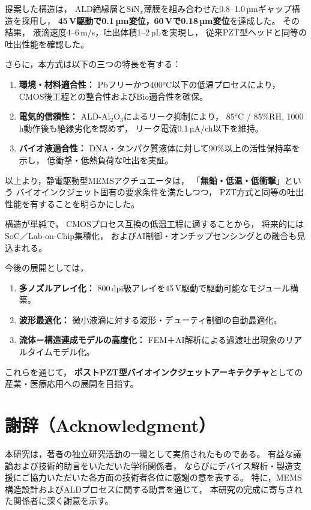 \documentclass[conference]{IEEEtran}
\begin{document}
提案した構造は，
ALD絶縁層とSiN$_x$薄膜を組み合わせた0.8--1.0\,µmギャップ構造を採用し，
\textbf{45\,V駆動で0.1\,µm変位，60\,Vで0.18\,µm変位}を達成した。
その結果，
液滴速度4--6\,m/s，吐出体積1--2\,pLを実現し，
従来PZT型ヘッドと同等の吐出性能を確認した。

さらに，本方式は以下の三つの特長を有する：
\begin{enumerate}
  \item \textbf{環境・材料適合性：}  
        Pbフリーかつ400°C以下の低温プロセスにより，
        CMOS後工程との整合性およびBio適合性を確保。
  \item \textbf{電気的信頼性：}  
        ALD-Al$_2$O$_3$によるリーク抑制により，
        85°C / 85\%RH, 1000 h動作後も絶縁劣化を認めず，
        リーク電流0.1\,µA/ch以下を維持。
  \item \textbf{バイオ液適合性：}  
        DNA・タンパク質液体に対して90\%以上の活性保持率を示し，
        低衝撃・低熱負荷な吐出を実証。
\end{enumerate}

以上より，静電駆動型MEMSアクチュエータは，
「\textbf{無鉛・低温・低衝撃}」という
バイオインクジェット固有の要求条件を満たしつつ，
PZT方式と同等の吐出性能を有することを明らかにした。

構造が単純で，
CMOSプロセス互換の低温工程に適することから，
将来的にはSoC／Lab-on-Chip集積化，
およびAI制御・オンチップセンシングとの融合も見込まれる。

今後の展開としては，
\begin{enumerate}
  \item \textbf{多ノズルアレイ化：}  
        800\,dpi級アレイを45\,V駆動で駆動可能なモジュール構築。
  \item \textbf{波形最適化：}  
        微小液滴に対する波形・デューティ制御の自動最適化。
  \item \textbf{流体－構造連成モデルの高度化：}  
        FEM＋AI解析による過渡吐出現象のリアルタイムモデル化。
\end{enumerate}

これらを通じて，
\textbf{ポストPZT型バイオインクジェットアーキテクチャ}としての
産業・医療応用への展開を目指す。

\section*{謝辞（Acknowledgment）}
本研究は，著者の独立研究活動の一環として実施されたものである。
有益な議論および技術的助言をいただいた学術関係者，
ならびにデバイス解析・製造支援にご協力いただいた各方面の技術者各位に感謝の意を表する。
特に，MEMS構造設計およびALDプロセスに関する助言を通じて，
本研究の完成に寄与された関係者に深く謝意を示す。
\end{document}

